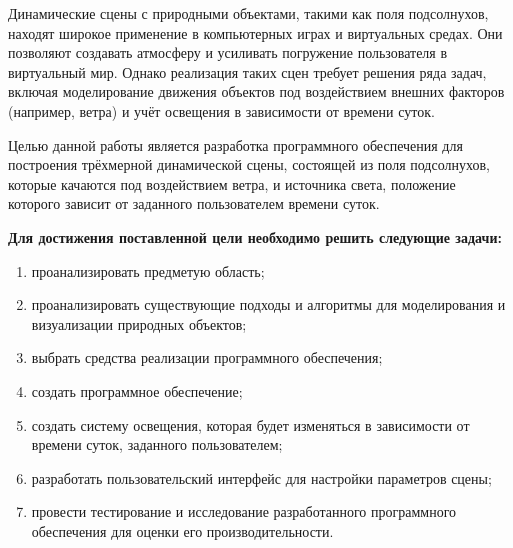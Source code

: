
Динамические сцены с природными объектами, такими как поля подсолнухов, находят широкое применение в компьютерных играх и виртуальных средах. Они позволяют создавать атмосферу и усиливать погружение пользователя в виртуальный мир. Однако реализация таких сцен требует решения ряда задач, включая моделирование движения объектов под воздействием внешних факторов (например, ветра) и учёт освещения в зависимости от времени суток.

Целью данной работы является разработка программного обеспечения для построения трёхмерной динамической сцены, состоящей из поля подсолнухов, которые качаются под воздействием ветра, и источника света, положение которого зависит от заданного пользователем времени суток.

\vspace{0.5cm}
\textbf {Для достижения поставленной цели необходимо решить следующие задачи:}
\begin{enumerate}
	\item проанализировать предметую область;
    \item проанализировать существующие подходы и алгоритмы для моделирования и визуализации природных объектов;
    \item выбрать средства реализации программного обеспечения;
    \item создать программное обеспечение;
    \item создать систему освещения, которая будет изменяться в зависимости от времени суток, заданного пользователем;
    \item разработать пользовательский интерфейс для настройки параметров сцены;
    \item провести тестирование и исследование разработанного программного обеспечения для оценки его производительности.
\end{enumerate}


\clearpage
